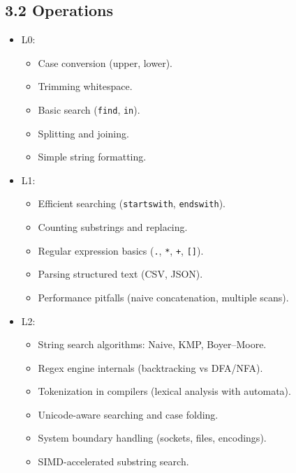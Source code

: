 \documentclass[
  letterpaper,
  DIV=11,
  numbers=noendperiod]{scrreprt}
\providecommand{\tightlist}{%
  \setlength{\itemsep}{0pt}\setlength{\parskip}{0pt}}
\begin{document}
\subsection{3.2 Operations}\label{operations-1}

\begin{itemize}
\item
  L0:

  \begin{itemize}
  \tightlist
  \item
    Case conversion (upper, lower).
  \item
    Trimming whitespace.
  \item
    Basic search (\texttt{find}, \texttt{in}).
  \item
    Splitting and joining.
  \item
    Simple string formatting.
  \end{itemize}
\item
  L1:

  \begin{itemize}
  \tightlist
  \item
    Efficient searching (\texttt{startswith}, \texttt{endswith}).
  \item
    Counting substrings and replacing.
  \item
    Regular expression basics (\texttt{.}, \texttt{*}, \texttt{+},
    \texttt{{[}{]}}).
  \item
    Parsing structured text (CSV, JSON).
  \item
    Performance pitfalls (naive concatenation, multiple scans).
  \end{itemize}
\item
  L2:

  \begin{itemize}
  \tightlist
  \item
    String search algorithms: Naive, KMP, Boyer--Moore.
  \item
    Regex engine internals (backtracking vs DFA/NFA).
  \item
    Tokenization in compilers (lexical analysis with automata).
  \item
    Unicode-aware searching and case folding.
  \item
    System boundary handling (sockets, files, encodings).
  \item
    SIMD-accelerated substring search.
  \end{itemize}
\end{itemize}
\end{document}
